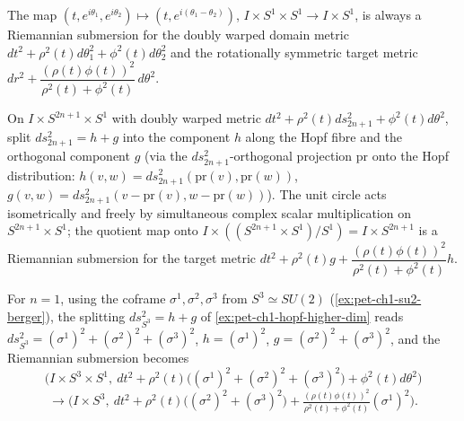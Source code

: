 \begin{example}
  \label{ex:pet-ch1-hopf-general-submersion}
  \leanok
  The map $(t,e^{i\theta_1},e^{i\theta_2})\mapsto(t,e^{i(\theta_1-\theta_2)})$,
  $I\times S^1\times S^1\to I\times S^1$, is always a Riemannian submersion for
  the doubly warped domain metric $dt^2+\rho^2(t)d\theta_1^2+\phi^2(t)d\theta_2^2$
  and the rotationally symmetric target metric
  $dr^2+\dfrac{(\rho(t)\phi(t))^2}{\rho^2(t)+\phi^2(t)}\,d\theta^2$.
\end{example}

\begin{example}
  \label{ex:pet-ch1-hopf-higher-dim}
  \leanok
  On $I\times S^{2n+1}\times S^1$ with doubly warped metric
  $dt^2+\rho^2(t)ds_{2n+1}^2+\phi^2(t)d\theta^2$, split
  $ds_{2n+1}^2=h+g$ into the component $h$ along the Hopf fibre and the
  orthogonal component $g$ (via the $ds_{2n+1}^2$-orthogonal projection $\mathrm{pr}$
  onto the Hopf distribution: $h(v,w)=ds_{2n+1}^2(\mathrm{pr}(v),\mathrm{pr}(w))$,
  $g(v,w)=ds_{2n+1}^2(v-\mathrm{pr}(v),w-\mathrm{pr}(w))$). The unit circle acts
  isometrically and freely by simultaneous complex scalar multiplication on
  $S^{2n+1}\times S^1$; the quotient map onto
  $I\times((S^{2n+1}\times S^1)/S^1)=I\times S^{2n+1}$ is a Riemannian submersion
  for the target metric
  $dt^2+\rho^2(t)g+\dfrac{(\rho(t)\phi(t))^2}{\rho^2(t)+\phi^2(t)}h$.
\end{example}

\begin{example}[Example 1.4.13 — the case $n=1$]
  \label{ex:pet-ch1-hopf-su2-coframe}
  \leanok
  For $n=1$, using the coframe $\sigma^1,\sigma^2,\sigma^3$ from
  $S^3\simeq SU(2)$ (\cref{ex:pet-ch1-su2-berger}), the splitting
  $ds^2_{S^3}=h+g$ of \cref{ex:pet-ch1-hopf-higher-dim} reads
  $ds^2_{S^3}=(\sigma^1)^2+(\sigma^2)^2+(\sigma^3)^2$, $h=(\sigma^1)^2$,
  $g=(\sigma^2)^2+(\sigma^3)^2$, and the Riemannian submersion becomes
  \[
    \Big(I\times S^3\times S^1,\ dt^2+\rho^2(t)\big((\sigma^1)^2+(\sigma^2)^2+(\sigma^3)^2\big)+\phi^2(t)d\theta^2\Big)
  \]
  \[
    \longrightarrow
    \Big(I\times S^3,\ dt^2+\rho^2(t)\big((\sigma^2)^2+(\sigma^3)^2\big)+\tfrac{(\rho(t)\phi(t))^2}{\rho^2(t)+\phi^2(t)}(\sigma^1)^2\Big).
  \]
\end{example}

